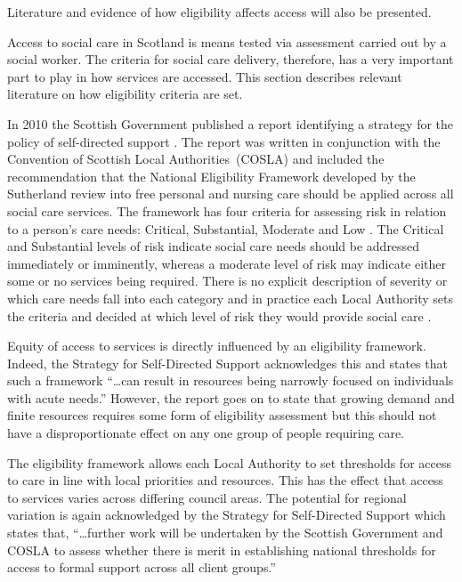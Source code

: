 \documentclass[12pt,]{report}
\begin{document}
Literature and evidence of how eligibility affects access will also be
presented.

Access to social care in Scotland is means tested via assessment carried
out by a social worker. The criteria for social care delivery,
therefore, has a very important part to play in how services are
accessed. This section describes relevant literature on how eligibility
criteria are set.

In 2010 the Scottish Government published a report identifying a
strategy for the policy of self-directed support \citep{RN171}. The
report was written in conjunction with the Convention of Scottish Local
Authorities~(COSLA) and included the recommendation that the National
Eligibility Framework developed by the Sutherland review into free
personal and nursing care \citeyearpar{RN172} should be applied across
all social care services. The framework has four criteria for assessing
risk in relation to a person's care needs: Critical, Substantial,
Moderate and Low \citep{RN184}. The Critical and Substantial levels of
risk indicate social care needs should be addressed immediately or
imminently, whereas a moderate level of risk may indicate either some or
no services being required. There is no explicit description of severity
or which care needs fall into each category and in practice each Local
Authority sets the criteria and decided at which level of risk they
would provide social care \citep{RN170}.

Equity of access to services is directly influenced by an eligibility
framework. Indeed, the Strategy for Self-Directed Support
\citep[pp.20]{RN171} acknowledges this and states that such a framework
``\ldots{}can result in resources being narrowly focused on individuals
with acute needs.'' However, the report goes on to state that growing
demand and finite resources requires some form of eligibility assessment
but this should not have a disproportionate effect on any one group of
people requiring care.

The eligibility framework allows each Local Authority to set thresholds
for access to care in line with local priorities and resources. This has
the effect that access to services varies across differing council
areas. The potential for regional variation is again acknowledged by the
Strategy for Self-Directed Support \citep[pp.20]{RN171} which states
that, ``\ldots{}further work will be undertaken by the Scottish
Government and COSLA to assess whether there is merit in establishing
national thresholds for access to formal support across all client
groups.''
\end{document}
